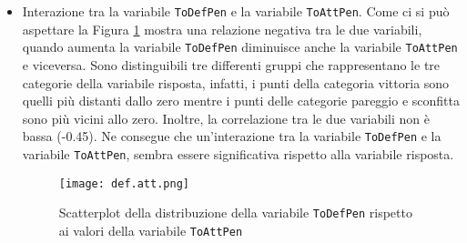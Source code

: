\begin{itemize}
	\item Interazione tra la variabile \texttt{ToDefPen} e la variabile \texttt{ToAttPen}. Come ci si può aspettare la Figura \ref{fig:defatt} mostra una relazione negativa tra le due variabili, quando aumenta la variabile \texttt{ToDefPen} diminuisce anche la variabile \texttt{ToAttPen} e viceversa. Sono distinguibili tre differenti gruppi che rappresentano le tre categorie della variabile risposta, infatti, i punti della categoria vittoria sono quelli più distanti dallo zero mentre i punti delle categorie pareggio e sconfitta sono più vicini allo zero. Inoltre, la correlazione tra le due variabili non è bassa (-0.45). Ne consegue che un'interazione tra la variabile \texttt{ToDefPen} e la variabile \texttt{ToAttPen}, sembra essere significativa rispetto alla variabile risposta.
	
	\begin{figure}[htbp]
		\begin{center}
			\texttt{[image: def.att.png]}
			\caption{Scatterplot della distribuzione della variabile \texttt{ToDefPen} rispetto ai valori della variabile \texttt{ToAttPen}}  \label{fig:defatt}
		\end{center}
	\end{figure}
	
\end{itemize}

